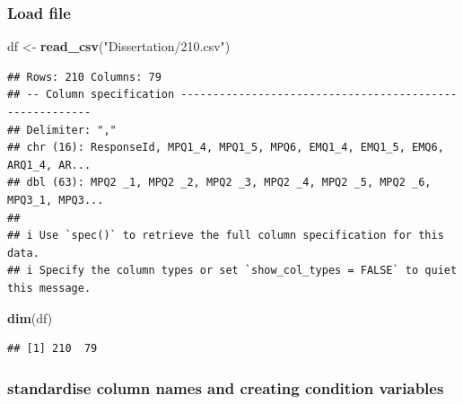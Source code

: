 \documentclass[
]{article}
\newenvironment{Shaded}{\begin{snugshade}}{\end{snugshade}}
\newcommand{\AttributeTok}[1]{\textcolor[rgb]{0.13,0.29,0.53}{#1}}
\newcommand{\ConstantTok}[1]{\textcolor[rgb]{0.56,0.35,0.01}{#1}}
\newcommand{\FunctionTok}[1]{\textcolor[rgb]{0.13,0.29,0.53}{\textbf{#1}}}
\newcommand{\NormalTok}[1]{#1}
\newcommand{\OtherTok}[1]{\textcolor[rgb]{0.56,0.35,0.01}{#1}}
\newcommand{\SpecialCharTok}[1]{\textcolor[rgb]{0.81,0.36,0.00}{\textbf{#1}}}
\newcommand{\StringTok}[1]{\textcolor[rgb]{0.31,0.60,0.02}{#1}}
\begin{document}
\subsubsection{Load file}\label{load-file}

\begin{Shaded}
\begin{Highlighting}[]
\NormalTok{df }\OtherTok{\textless{}{-}} \FunctionTok{read\_csv}\NormalTok{(}\StringTok{"Dissertation/210.csv"}\NormalTok{)}
\end{Highlighting}
\end{Shaded}

\begin{verbatim}
## Rows: 210 Columns: 79
## -- Column specification --------------------------------------------------------
## Delimiter: ","
## chr (16): ResponseId, MPQ1_4, MPQ1_5, MPQ6, EMQ1_4, EMQ1_5, EMQ6, ARQ1_4, AR...
## dbl (63): MPQ2 _1, MPQ2 _2, MPQ2 _3, MPQ2 _4, MPQ2 _5, MPQ2 _6, MPQ3_1, MPQ3...
## 
## i Use `spec()` to retrieve the full column specification for this data.
## i Specify the column types or set `show_col_types = FALSE` to quiet this message.
\end{verbatim}

\begin{Shaded}
\begin{Highlighting}[]
\FunctionTok{dim}\NormalTok{(df)}
\end{Highlighting}
\end{Shaded}

\begin{verbatim}
## [1] 210  79
\end{verbatim}

\subsubsection{standardise column names and creating condition
variables}\label{standardise-column-names-and-creating-condition-variables}

\begin{Shaded}
\end{Shaded}
\end{document}
